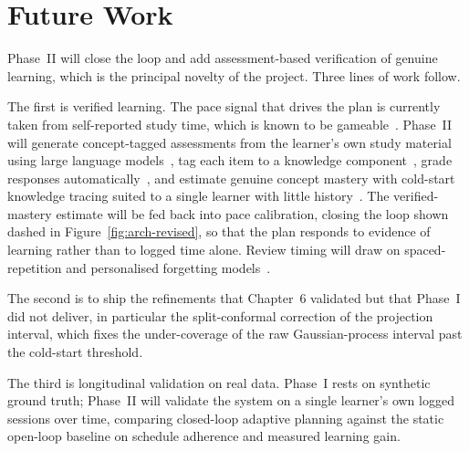 \section{Future Work}
Phase~II will close the loop and add assessment-based verification of genuine learning, which is the principal novelty of the project. Three lines of work follow.

The first is verified learning. The pace signal that drives the plan is currently taken from self-reported study time, which is known to be gameable~\cite{gaming2026}. Phase~II will generate concept-tagged assessments from the learner's own study material using large language models~\cite{itemgen2024,lecturequiz2026}, tag each item to a knowledge component~\cite{kctag2024}, grade responses automatically~\cite{llmgrade2024}, and estimate genuine concept mastery with cold-start knowledge tracing suited to a single learner with little history~\cite{clst2024,maml2026}. The verified-mastery estimate will be fed back into pace calibration, closing the loop shown dashed in Figure~\ref{fig:arch-revised}, so that the plan responds to evidence of learning rather than to logged time alone. Review timing will draw on spaced-repetition and personalised forgetting models~\cite{spaced2025,conceptkt2026}.

The second is to ship the refinements that Chapter~6 validated but that Phase~I did not deliver, in particular the split-conformal correction of the projection interval, which fixes the under-coverage of the raw Gaussian-process interval past the cold-start threshold.

The third is longitudinal validation on real data. Phase~I rests on synthetic ground truth; Phase~II will validate the system on a single learner's own logged sessions over time, comparing closed-loop adaptive planning against the static open-loop baseline on schedule adherence and measured learning gain.
